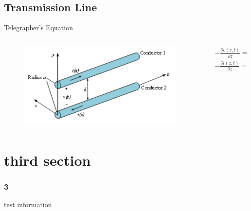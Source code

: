 \documentclass{beamer}
\begin{document}
\subsection{Transmission Line}
\begin{frame}{Telegrapher's Equation}
  \begin{columns}
    \begin{column}{0.45\textwidth}
      \begin{figure}
        \includegraphics[width=\textwidth]{figures/transmission}
      \end{figure}
    \end{column}
    \begin{column}{0.55\textwidth}
      \begin{align*}
        &-\frac{\partial v(z,t)}{\partial z}=\mathop{R'}i(z,t)+\mathop{L'}\frac{\partial i(z,t)}{\partial z} \\
        &-\frac{\partial i(z,t)}{\partial z}=\mathop{G'}v(z,t)+\mathop{C'}\frac{\partial v(z,t)}{\partial z} \\
      \end{align*}
    \end{column}
  \end{columns}
\end{frame}

\section{third section}
\begin{frame}
  \frametitle{3}
  test information
\end{frame}
\end{document}
